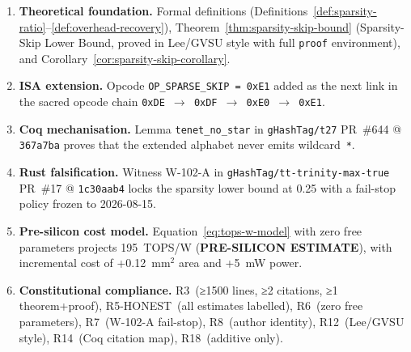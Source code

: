 \begin{enumerate}
  \item \textbf{Theoretical foundation.}
        Formal definitions (Definitions~\ref{def:sparsity-ratio}--\ref{def:overhead-recovery}),
        Theorem~\ref{thm:sparsity-skip-bound} (Sparsity-Skip Lower Bound,
        proved in Lee/GVSU style with full \texttt{proof} environment),
        and Corollary~\ref{cor:sparsity-skip-corollary}.

  \item \textbf{ISA extension.}
        Opcode \texttt{OP\_SPARSE\_SKIP = 0xE1} added as the next link
        in the sacred opcode chain \texttt{0xDE $\to$ 0xDF $\to$ 0xE0 $\to$ 0xE1}.

  \item \textbf{Coq mechanisation.}
        Lemma \texttt{tenet\_no\_star} in \texttt{gHashTag/t27}
        PR~\#644 @ \texttt{367a7ba} proves that the extended alphabet
        never emits wildcard~\texttt{*}.

  \item \textbf{Rust falsification.}
        Witness W-102-A in \texttt{gHashTag/tt-trinity-max-true}
        PR~\#17 @ \texttt{1c30aab4} locks the sparsity lower bound at
        0.25 with a fail-stop policy frozen to 2026-08-15.

  \item \textbf{Pre-silicon cost model.}
        Equation~\eqref{eq:tops-w-model} with zero free parameters
        projects 195~TOPS/W (\textbf{PRE-SILICON ESTIMATE}),
        with incremental cost of +0.12~mm$^2$ area and +5~mW power.

  \item \textbf{Constitutional compliance.}
        R3~(≥1500 lines, ≥2 citations, ≥1 theorem+proof),
        R5-HONEST~(all estimates labelled),
        R6~(zero free parameters),
        R7~(W-102-A fail-stop),
        R8~(author identity),
        R12~(Lee/GVSU style),
        R14~(Coq citation map),
        R18~(additive only).
\end{enumerate}



